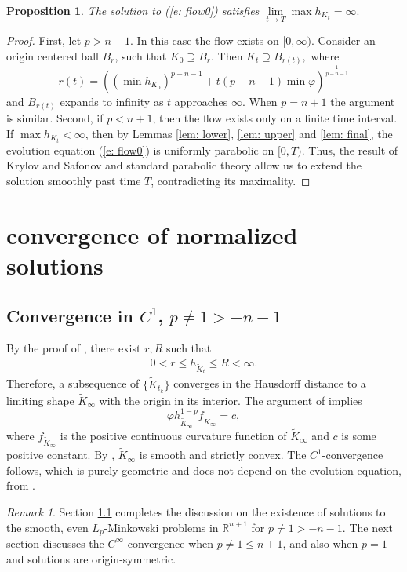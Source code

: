 \documentclass{amsart}
\newtheorem{proposition}[theorem]{Proposition}
\theoremstyle{definition}
\theoremstyle{remark}
\newtheorem{remark}[theorem]{Remark}
\numberwithin{equation}{section}
\begin{document}
\begin{proposition}\label{prop: expansion to infty}
The solution to (\ref{e: flow0}) satisfies $\lim\limits_{t\to T}\max h_{K_t}=\infty.$
\end{proposition}
\begin{proof}
First, let $p> n+1.$ In this case the flow exists on $[0,\infty).$
Consider an origin centered ball $B_r$, such that $K_0\supseteq B_r.$ Then $K_t\supseteq B_{r(t)},$ where $$r(t)=\left((\min h_{K_0})^{p-n-1}+t(p-n-1)\min \varphi \right)^{\frac{1}{p-n-1}}$$ and $B_{r(t)}$ expands to infinity as $t$ approaches $\infty$. When $p=n+1$ the argument is similar. Second, if $p<n+1$, then the flow exists only on a finite time interval. If $\max h_{K_t}<\infty$, then by Lemmas \ref{lem: lower}, \ref{lem: upper} and \ref{lem: final}, the evolution equation (\ref{e: flow0}) is uniformly parabolic on $[0,T)$. Thus, the result of Krylov and Safonov \cite{Krylov-Safonov} and standard parabolic theory allow us to extend the solution smoothly past time $T$, contradicting its maximality.
\end{proof}
\section{convergence of normalized solutions}\label{sec: nor conv}
\subsection{Convergence in $C^{1}$, $p\neq 1>-n-1$}\label{sec}
By the proof of \cite[Corollary 7.5]{Ivaki 2014-gauss}, there exist $r,R$ such that
\begin{align}\label{ratio}
0<r\leq h_{\tilde{K}_t}\leq R<\infty.
\end{align}
Therefore, a subsequence of $\{\tilde{K}_{t_k}\}$ converges in the Hausdorff distance to a limiting shape $\tilde{K}_{\infty}$ with the origin in its interior. The argument of \cite[Section 8.1]{Ivaki 2014-gauss} implies  $$\varphi h_{\tilde{K}_{\infty}}^{1-p}f_{\tilde{K}_{\infty}}=c,$$ where $f_{\tilde{K}_{\infty}}$ is the positive continuous curvature function of $\tilde{K}_{\infty}$ and $c$ is some positive constant. By \cite[Fact 8.1]{Ivaki 2014-gauss}, $\tilde{K}_{\infty}$  is smooth and strictly convex. The $C^1$-convergence follows, which is purely geometric and does not depend on the evolution equation, from \cite[Lemma 13]{Andrews 1997}.
\begin{remark}\label{rem}
Section \ref{sec} completes the discussion on the existence of solutions to the smooth, even $L_p$-Minkowski problems in $\mathbb{R}^{n+1}$ for $p\neq 1>-n-1.$ The next section discusses  the $C^{\infty}$ convergence when $p\neq1\leq n+1$, and also when $p=1$ and solutions are origin-symmetric.
\end{remark}
\end{document}
